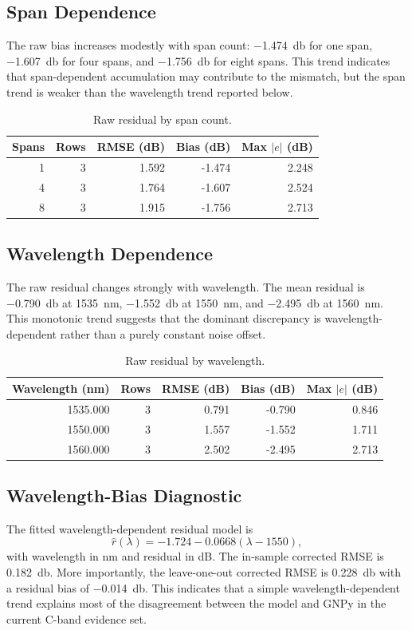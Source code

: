 \documentclass[journal]{IEEEtran}
\begin{document}
\subsection{Span Dependence}
The raw bias increases modestly with span count: \SI{-1.474}{\decibel} for one span, \SI{-1.607}{\decibel} for four spans, and \SI{-1.756}{\decibel} for eight spans. This trend indicates that span-dependent accumulation may contribute to the mismatch, but the span trend is weaker than the wavelength trend reported below.

\begin{table}[!t]
\centering
\caption{Raw residual by span count.}
\label{tab:span}
\begin{tabular}{rrrrr}
\toprule
Spans & Rows & RMSE (dB) & Bias (dB) & Max $|e|$ (dB)\\
\midrule
1 & 3 & 1.592 & -1.474 & 2.248\\
4 & 3 & 1.764 & -1.607 & 2.524\\
8 & 3 & 1.915 & -1.756 & 2.713\\
\bottomrule
\end{tabular}
\end{table}

\subsection{Wavelength Dependence}
The raw residual changes strongly with wavelength. The mean residual is \SI{-0.790}{\decibel} at \SI{1535}{\nano\meter}, \SI{-1.552}{\decibel} at \SI{1550}{\nano\meter}, and \SI{-2.495}{\decibel} at \SI{1560}{\nano\meter}. This monotonic trend suggests that the dominant discrepancy is wavelength-dependent rather than a purely constant noise offset.

\begin{table}[!t]
\centering
\caption{Raw residual by wavelength.}
\label{tab:wavelength}
\begin{tabular}{rrrrr}
\toprule
Wavelength (nm) & Rows & RMSE (dB) & Bias (dB) & Max $|e|$ (dB)\\
\midrule
1535.000 & 3 & 0.791 & -0.790 & 0.846\\
1550.000 & 3 & 1.557 & -1.552 & 1.711\\
1560.000 & 3 & 2.502 & -2.495 & 2.713\\
\bottomrule
\end{tabular}
\end{table}

\subsection{Wavelength-Bias Diagnostic}
The fitted wavelength-dependent residual model is
\begin{equation}
\hat{r}(\lambda)= -1.724 - 0.0668(\lambda - 1550),
\label{eq:fitted_bias}
\end{equation}
with wavelength in nm and residual in dB. The in-sample corrected RMSE is \SI{0.182}{\decibel}. More importantly, the leave-one-out corrected RMSE is \SI{0.228}{\decibel} with a residual bias of \SI{-0.014}{\decibel}. This indicates that a simple wavelength-dependent trend explains most of the disagreement between the model and GNPy in the current C-band evidence set.
\end{document}
